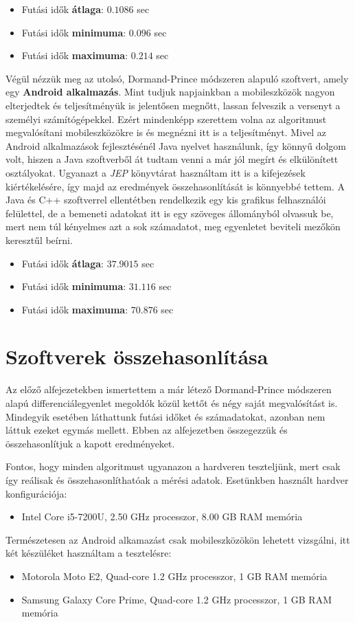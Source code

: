 \begin{itemize}
	\item Futási idők \textbf{átlaga}: $ 0.1086 $ sec
	\item Futási idők \textbf{minimuma}: $ 0.096 $ sec
	\item Futási idők \textbf{maximuma}: $ 0.214 $ sec
\end{itemize}

Végül nézzük meg az utolsó, Dormand-Prince módszeren alapuló szoftvert, amely egy \textbf{Android alkalmazás}. Mint tudjuk napjainkban a mobileszközök nagyon elterjedtek és teljesítményük is jelentősen megnőtt, lassan felveszik a versenyt a személyi számítógépekkel. Ezért mindenképp szerettem volna az algoritmust megvalósítani mobileszközökre is és megnézni itt is a teljesítményt. Mivel az Android alkalmazások fejlesztésénél Java nyelvet használunk, így könnyű dolgom volt, hiszen a Java szoftverből át tudtam venni a már jól megírt és elkülönített osztályokat. Ugyanazt a \textit{JEP} könyvtárat használtam itt is a kifejezések kiértékelésére, így majd az eredmények összehasonlítását is könnyebbé tettem. A Java és C++ szoftverrel ellentétben rendelkezik egy kis grafikus felhasználói felülettel, de a bemeneti adatokat itt is egy szöveges állományból olvassuk be, mert nem túl kényelmes azt a sok számadatot, meg egyenletet beviteli mezőkön keresztűl beírni.


\begin{itemize}
	\item Futási idők \textbf{átlaga}: $ 37.9015 $ sec
	\item Futási idők \textbf{minimuma}: $ 31.116 $ sec
	\item Futási idők \textbf{maximuma}: $ 70.876 $ sec
\end{itemize}

\section {Szoftverek összehasonlítása} \label{fejezet3_3}

Az előző alfejezetekben ismertettem a már létező Dormand-Prince módszeren alapú differenciálegyenlet megoldók közül kettőt és négy saját megvalósítást is. Mindegyik esetében láthattunk futási időket és számadatokat, azonban nem láttuk ezeket egymás mellett. Ebben az alfejezetben összegezzük és összehasonlítjuk a kapott eredményeket.

Fontos, hogy minden algoritmust ugyanazon a hardveren teszteljünk, mert csak így reálisak és összehasonlíthatóak a mérési adatok. Esetünkben használt hardver konfigurációja:
\begin{itemize}
	\item Intel Core i5-7200U, 2.50 GHz processzor, 8.00 GB RAM memória
\end{itemize}
Természetesen az Android alkamazást csak mobileszközökön lehetett vizsgálni, itt két készüléket használtam a tesztelésre:
\begin{itemize}
	\item Motorola Moto E2, Quad-core 1.2 GHz processzor, 1 GB RAM memória
	\item Samsung Galaxy Core Prime, Quad-core 1.2 GHz processzor, 1 GB RAM memória
\end{itemize}


